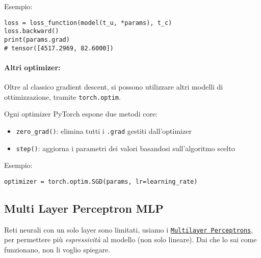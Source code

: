 Esempio:
\begin{verbatim}
loss = loss_function(model(t_u, *params), t_c)
loss.backward()
print(params.grad)
# tensor([4517.2969, 82.6000])
\end{verbatim}

\paragraph{Altri optimizer:} Oltre al classico gradient descent, si possono utilizzare altri modelli di ottimizzazione, tramite \texttt{torch.optim}.

Ogni optimizer PyTorch espone due metodi core: 
\begin{itemize}
    \item \texttt{zero\_grad()}: elimina tutti i \texttt{.grad} gestiti dall'optimizer
    
    \item \texttt{step()}: aggiorna i parametri dei valori basandosi sull'algoritmo scelto
\end{itemize}

Esempio: 
\begin{verbatim}
optimizer = torch.optim.SGD(params, lr=learning_rate)
\end{verbatim}

\subsection{Multi Layer Perceptron MLP}

Reti neurali con un solo layer sono limitati, usiamo i \href{https://it.wikipedia.org/wiki/Percettrone_multistrato}{\texttt{Multilayer Perceptrons}}, per permettere più \textit{espressività} al modello (non solo lineare). Dai che lo sai come funzionano, non li voglio spiegare.

